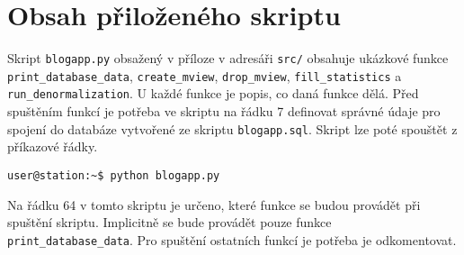 \documentclass[11pt]{article}
\begin{document}
\section{Obsah přiloženého skriptu}

Skript \lstinline[style=inline]|blogapp.py| obsažený v příloze v adresáři \lstinline[style=inline]|src/| obsahuje ukázkové funkce \lstinline[style=inline]|print_database_data|, \lstinline[style=inline]|create_mview|, \lstinline[style=inline]|drop_mview|, \lstinline[style=inline]|fill_statistics| a \lstinline[style=inline]|run_denormalization|. U každé funkce je popis, co daná funkce dělá. Před spuštěním funkcí je potřeba ve skriptu na řádku 7 definovat správné údaje pro spojení do databáze vytvořené ze skriptu \lstinline[style=inline]|blogapp.sql|. Skript lze poté spouštět z příkazové řádky.

\begin{lstlisting}[style=python]
user@station:~$ python blogapp.py
\end{lstlisting}

Na řádku 64 v tomto skriptu je určeno, které funkce se budou provádět při spuštění skriptu. Implicitně se bude provádět pouze funkce \lstinline[style=inline]|print_database_data|. Pro spuštění ostatních funkcí je potřeba je odkomentovat.
\end{document}
